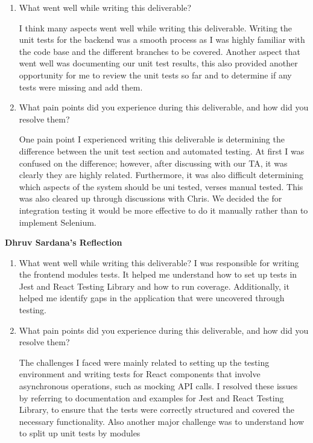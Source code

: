 \documentclass[12pt, titlepage]{article}
\begin{document}
\begin{enumerate}
  \item What went well while writing this deliverable?

    I think many aspects went well while writing this deliverable.
    Writing the unit tests for the backend was a smooth process as
    I was highly familiar with the code base and the different
    branches to be covered. Another aspect that went well was
    documenting our unit test results, this also provided another
    opportunity for me to review the unit
    tests so far and to determine if any tests were missing and add them.

  \item What pain points did you experience during this deliverable, and how
    did you resolve them?

    One pain point I experienced writing this deliverable is
    determining the difference between the unit test section and
    automated testing.
    At first I was confused on the difference; however, after
    discussing with our TA, it was clearly they are highly related.
    Furthermore, it was also difficult determining which aspects of
    the system should be uni tested, verses manual tested. This was
    also cleared up through
    discussions with Chris. We decided the for integration testing it
    would be more effective to do it manually rather than to implement Selenium.

\end{enumerate}

\textbf{Dhruv Sardana's Reflection}

\begin{enumerate}
  \item What went well while writing this deliverable?
    I was responsible for writing the frontend modules tests.
    It helped me understand how to set up tests in Jest and React
    Testing Library and how to run coverage.
    Additionally, it helped me identify gaps in the application that
    were uncovered through testing.

  \item What pain points did you experience during this deliverable, and how
    did you resolve them?

    The challenges I faced were mainly related to setting up the
    testing environment and writing tests for React components that
    involve asynchronous operations,
    such as mocking API calls. I resolved these issues by referring
    to documentation and examples for Jest and React Testing Library,
    to ensure that the tests were correctly structured and covered
    the necessary functionality. Also another major challenge was to
    understand how to split up unit tests by modules
\end{enumerate}
\end{document}
